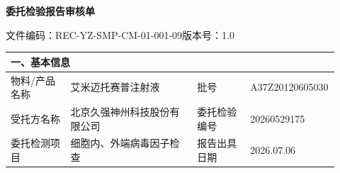 \documentclass[UTF8,10pt,a4paper,fontset=fandol]{ctexart}
\newcommand{\fieldvalue}[1]{#1}
\begin{document}
\newpage

\begin{center}
\textbf{委托检验报告审核单}
\end{center}

\noindent
文件编码：REC-YZ-SMP-CM-01-001-09\qquad 版本号：1.0

\begin{tabular}{|p{0.18\linewidth}|p{0.38\linewidth}|p{0.16\linewidth}|p{0.20\linewidth}|}
\hline
\multicolumn{4}{l|}{一、基本信息}\\
\hline
物料/产品名称 &
\fieldvalue{艾米迈托赛普注射液} &
批号 &
\fieldvalue{A37Z20120605030}\\
\hline
受托方名称 &
\fieldvalue{北京久强神州科技股份有限公司} &
委托检验编号 &
\fieldvalue{20260529175}\\
\hline
委托检测项目 &
\fieldvalue{细胞内、外端病毒因子检查} &
报告出具日期 &
\fieldvalue{2026.07.06}\\
\hline
\end{tabular}

\vspace{0.5em}
\end{document}

